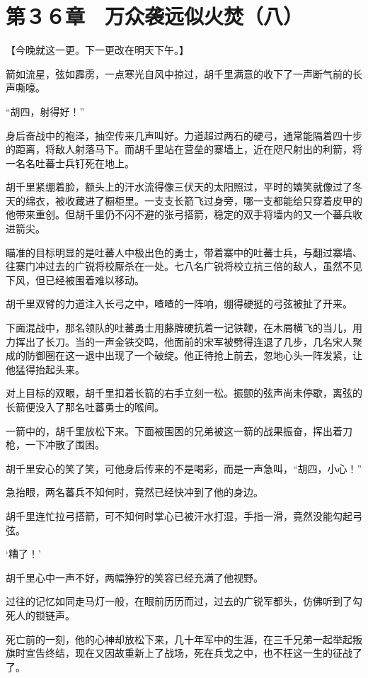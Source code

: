 \section{第３６章　万众袭远似火焚（八） }

【今晚就这一更。下一更改在明天下午。】

箭如流星，弦如霹雳，一点寒光自风中掠过，胡千里满意的收下了一声断气前的长声嘶嚎。

“胡四，射得好！”

身后奋战中的袍泽，抽空传来几声叫好。力道超过两石的硬弓，通常能隔着四十步的距离，将敌人射落马下。而胡千里站在营垒的寨墙上，近在咫尺射出的利箭，将一名名吐蕃士兵钉死在地上。

胡千里紧绷着脸，额头上的汗水流得像三伏天的太阳照过，平时的嬉笑就像过了冬天的绵衣，被收藏进了橱柜里。一支支长箭飞过身旁，哪一支都能给只穿着皮甲的他带来重创。但胡千里仍不闪不避的张弓搭箭，稳定的双手将墙内的又一个蕃兵收进箭尖。

瞄准的目标明显的是吐蕃人中极出色的勇士，带着寨中的吐蕃士兵，与翻过寨墙、往寨门冲过去的广锐将校厮杀在一处。七八名广锐将校立抗三倍的敌人，虽然不见下风，但已经被围着难以移动。

胡千里双臂的力道注入长弓之中，喳喳的一阵响，绷得硬挺的弓弦被扯了开来。

下面混战中，那名领队的吐蕃勇士用藤牌硬抗着一记铁鞭，在木屑横飞的当儿，用力挥出了长刀。当的一声金铁交鸣，他面前的宋军被劈得连退了几步，几名宋人聚成的防御圈在这一退中出现了一个破绽。他正待抢上前去，忽地心头一阵发紧，让他猛得抬起头来。

对上目标的双眼，胡千里扣着长箭的右手立刻一松。振颤的弦声尚未停歇，离弦的长箭便没入了那名吐蕃勇士的喉间。

一箭中的，胡千里放松下来。下面被围困的兄弟被这一箭的战果振奋，挥出着刀枪，一下冲散了围困。

胡千里安心的笑了笑，可他身后传来的不是喝彩，而是一声急叫，“胡四，小心！”

急抬眼，两名蕃兵不知何时，竟然已经快冲到了他的身边。

胡千里连忙拉弓搭箭，可不知何时掌心已被汗水打湿，手指一滑，竟然没能勾起弓弦。

‘糟了！’

胡千里心中一声不好，两幅狰狞的笑容已经充满了他视野。

过往的记忆如同走马灯一般，在眼前历历而过，过去的广锐军都头，仿佛听到了勾死人的锁链声。

死亡前的一刻，他的心神却放松下来，几十年军中的生涯，在三千兄弟一起举起叛旗时宣告终结，现在又因故重新上了战场，死在兵戈之中，也不枉这一生的征战了了。

